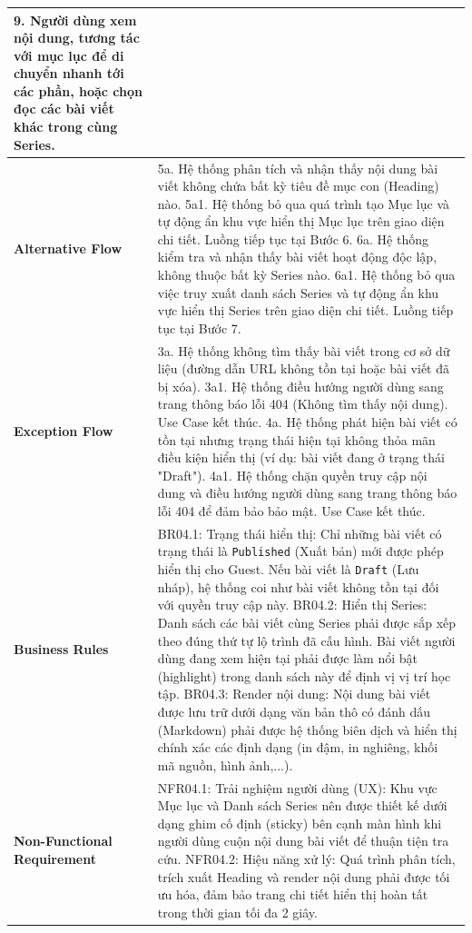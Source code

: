\documentclass[a4paper,12pt]{article}
\begin{document}
\begin{longtable}{|p{4cm}|p{11.5cm}|}
9. Người dùng xem nội dung, tương tác với mục lục để di chuyển nhanh tới các phần, hoặc chọn đọc các bài viết khác trong cùng Series. \\ \hline
\textbf{Alternative Flow} & 
5a. Hệ thống phân tích và nhận thấy nội dung bài viết không chứa bất kỳ tiêu đề mục con (Heading) nào. \newline
5a1. Hệ thống bỏ qua quá trình tạo Mục lục và tự động ẩn khu vực hiển thị Mục lục trên giao diện chi tiết. \newline
Luồng tiếp tục tại Bước 6. \newline
6a. Hệ thống kiểm tra và nhận thấy bài viết hoạt động độc lập, không thuộc bất kỳ Series nào. \newline
6a1. Hệ thống bỏ qua việc truy xuất danh sách Series và tự động ẩn khu vực hiển thị Series trên giao diện chi tiết. \newline
Luồng tiếp tục tại Bước 7. \\ \hline
\textbf{Exception Flow} & 
3a. Hệ thống không tìm thấy bài viết trong cơ sở dữ liệu (đường dẫn URL không tồn tại hoặc bài viết đã bị xóa). \newline
3a1. Hệ thống điều hướng người dùng sang trang thông báo lỗi 404 (Không tìm thấy nội dung). \newline
Use Case kết thúc. \newline
4a. Hệ thống phát hiện bài viết có tồn tại nhưng trạng thái hiện tại không thỏa mãn điều kiện hiển thị (ví dụ: bài viết đang ở trạng thái "Draft"). \newline
4a1. Hệ thống chặn quyền truy cập nội dung và điều hướng người dùng sang trang thông báo lỗi 404 để đảm bảo bảo mật. \newline
Use Case kết thúc. \\ \hline
\textbf{Business Rules} & 
BR04.1: Trạng thái hiển thị: Chỉ những bài viết có trạng thái là \texttt{Published} (Xuất bản) mới được phép hiển thị cho Guest. Nếu bài viết là \texttt{Draft} (Lưu nháp), hệ thống coi như bài viết không tồn tại đối với quyền truy cập này. \newline
BR04.2: Hiển thị Series: Danh sách các bài viết cùng Series phải được sắp xếp theo đúng thứ tự lộ trình đã cấu hình. Bài viết người dùng đang xem hiện tại phải được làm nổi bật (highlight) trong danh sách này để định vị vị trí học tập. \newline
BR04.3: Render nội dung: Nội dung bài viết được lưu trữ dưới dạng văn bản thô có đánh dấu (Markdown) phải được hệ thống biên dịch và hiển thị chính xác các định dạng (in đậm, in nghiêng, khối mã nguồn, hình ảnh,...). \\ \hline
\textbf{Non-Functional Requirement} & 
NFR04.1: Trải nghiệm người dùng (UX): Khu vực Mục lục và Danh sách Series nên được thiết kế dưới dạng ghim cố định (sticky) bên cạnh màn hình khi người dùng cuộn nội dung bài viết để thuận tiện tra cứu. \newline
NFR04.2: Hiệu năng xử lý: Quá trình phân tích, trích xuất Heading và render nội dung phải được tối ưu hóa, đảm bảo trang chi tiết hiển thị hoàn tất trong thời gian tối đa 2 giây. \\ \hline
\end{longtable}
\end{document}
